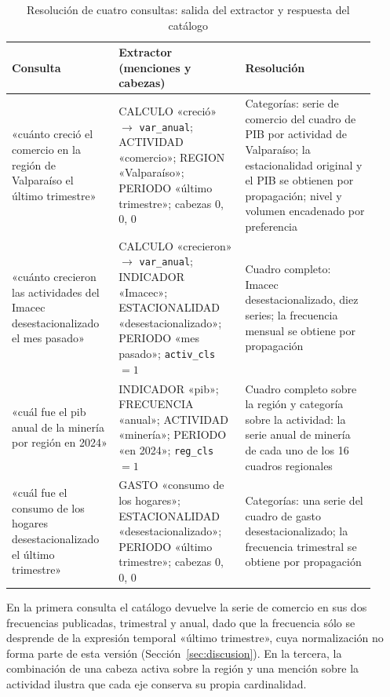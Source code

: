 \documentclass[11pt]{article}
\begin{document}
\begin{table}[htbp]
\centering
\caption{Resolución de cuatro consultas: salida del extractor y respuesta del catálogo}
\label{tab:ejemplos}
\small
\begin{tabular}{p{0.27\linewidth} p{0.32\linewidth} p{0.33\linewidth}}
\toprule
Consulta & Extractor (menciones y cabezas) & Resolución \\
\midrule
«cuánto creció el comercio en la región de Valparaíso el último trimestre»
& CALCULO «creció» $\to$ \texttt{var\_anual}; ACTIVIDAD «comercio»; REGION «Valparaíso»; PERIODO «último trimestre»; cabezas 0, 0, 0
& Categorías: serie de comercio del cuadro de PIB por actividad de Valparaíso; la estacionalidad original y el PIB se obtienen por propagación; nivel y volumen encadenado por preferencia \\
\addlinespace[3pt]
«cuánto crecieron las actividades del Imacec desestacionalizado el mes pasado»
& CALCULO «crecieron» $\to$ \texttt{var\_anual}; INDICADOR «Imacec»; ESTACIONALIDAD «desestacionalizado»; PERIODO «mes pasado»; \texttt{activ\_cls} $=1$
& Cuadro completo: Imacec desestacionalizado, diez series; la frecuencia mensual se obtiene por propagación \\
\addlinespace[3pt]
«cuál fue el pib anual de la minería por región en 2024»
& INDICADOR «pib»; FRECUENCIA «anual»; ACTIVIDAD «minería»; PERIODO «en 2024»; \texttt{reg\_cls} $=1$
& Cuadro completo sobre la región y categoría sobre la actividad: la serie anual de minería de cada uno de los 16 cuadros regionales \\
\addlinespace[3pt]
«cuál fue el consumo de los hogares desestacionalizado el último trimestre»
& GASTO «consumo de los hogares»; ESTACIONALIDAD «desestacionalizado»; PERIODO «último trimestre»; cabezas 0, 0, 0
& Categorías: una serie del cuadro de gasto desestacionalizado; la frecuencia trimestral se obtiene por propagación \\
\bottomrule
\end{tabular}
\end{table}

En la primera consulta el catálogo devuelve la serie de comercio en sus dos
frecuencias publicadas, trimestral y anual, dado que la frecuencia sólo se
desprende de la expresión temporal «último trimestre», cuya normalización no
forma parte de esta versión (Sección~\ref{sec:discusion}). En la tercera, la
combinación de una cabeza activa sobre la región y una mención sobre la
actividad ilustra que cada eje conserva su propia cardinalidad.
\end{document}
